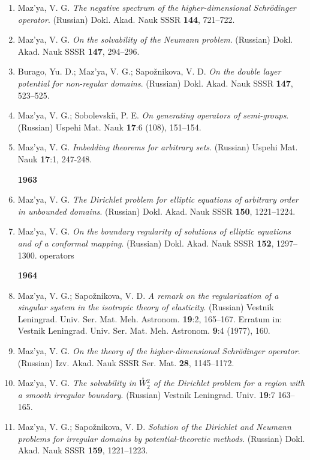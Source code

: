 \documentclass{article}
\begin{document}
\begin{enumerate}
{\bf 1962}
\item Maz'ya, V. G. {\it The negative spectrum of the
higher-dimensional
Schr\"odinger operator}. (Russian) Dokl. Akad. Nauk
SSSR {\bf 144}, 721--722.
\item Maz'ya, V. G. {\it On the solvability of the Neumann problem}.
(Russian) Dokl. Akad. Nauk SSSR {\bf 147},
294--296.
\item Burago, Yu. D.; Maz'ya, V. G.; Sapo\v znikova, V. D. {\it On the
double layer potential  for non-regular
domains}. (Russian) Dokl. Akad. Nauk SSSR {\bf 147}, 523--525.
\item Maz'ya, V. G.; Sobolevski{\u\i}, P. E. {\it On generating
operators
of semi-groups}. (Russian) Uspehi Mat.
Nauk {\bf 17}:6 (108), 151--154.
\item Maz'ya, V. G. {\it Imbedding theorems for arbitrary sets}.
(Russian)
Uspehi Mat. Nauk {\bf 17}:1, 247-248.\hfill\break

{\bf 1963}
\item Maz'ya, V. G. {\it The Dirichlet problem for elliptic equations
of
arbitrary order in unbounded domains}.
(Russian) Dokl. Akad. Nauk SSSR {\bf 150}, 1221--1224.
\item Maz'ya, V. G. {\it On the boundary regularity of solutions of
elliptic equations and of a conformal mapping}.
(Russian) Dokl. Akad. Nauk SSSR {\bf 152}, 1297--1300.
operators

{\bf 1964}
\item Maz'ya, V. G.; Sapo\v znikova, V. D. {\it A remark on the
regularization of a singular system in the isotropic
theory of elasticity}. (Russian) Vestnik Leningrad. Univ. Ser. Mat.
Meh.
Astronom. {\bf 19}:2, 165--167. Erratum in: Vestnik
Leningrad. Univ. Ser. Mat. Meh. Astronom. {\bf 9}:4 (1977), 160.
\item Maz'ya, V. G. {\it On the theory of the higher-dimensional
Schr\"odinger operator}.
(Russian) Izv. Akad. Nauk SSSR Ser. Mat. {\bf 28}, 1145--1172.
\item Maz'ya, V. G. {\it The solvability in $\stackrel{\circ}{W}
\!\!{}^2_2$ of the Dirichlet problem for a region with a smooth
irregular
boundary}. (Russian) Vestnik Leningrad. Univ. {\bf 19}:7 163--165.
\item Maz'ya, V. G.; Sapo\v znikova, V. D. {\it Solution of the
Dirichlet
and Neumann problems for irregular domains by potential-theoretic
methods}.
(Russian) Dokl. Akad. Nauk SSSR {\bf 159}, 1221--1223.\hfill\break


\end{enumerate}
\end{document}
